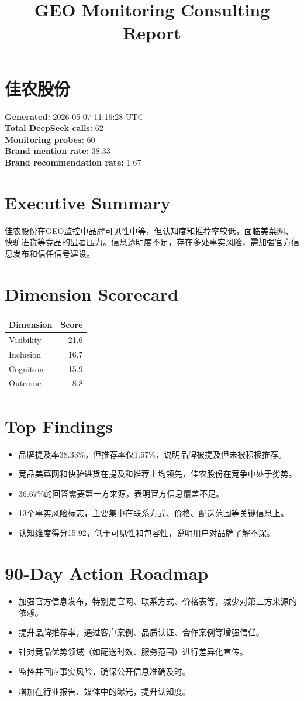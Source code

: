 \documentclass[11pt]{article}
\title{GEO Monitoring Consulting Report}
\begin{document}
\maketitle
\section*{佳农股份}
\textbf{Generated:} 2026-05-07 11:16:28 UTC\\
\textbf{Total DeepSeek calls:} 62\\
\textbf{Monitoring probes:} 60\\
\textbf{Brand mention rate:} 38.33\\
\textbf{Brand recommendation rate:} 1.67\\
\section*{Executive Summary}
佳农股份在GEO监控中品牌可见性中等，但认知度和推荐率较低，面临美菜网、快驴进货等竞品的显著压力。信息透明度不足，存在多处事实风险，需加强官方信息发布和信任信号建设。
\section*{Dimension Scorecard}
\begin{tabular}{lr}\toprule Dimension & Score\\\midrule
Visibility & 21.6\\
Inclusion & 16.7\\
Cognition & 15.9\\
Outcome & 8.8\\
\bottomrule\end{tabular}
\section*{Top Findings}
\begin{itemize}
\item 品牌提及率38.33\%，但推荐率仅1.67\%，说明品牌被提及但未被积极推荐。
\item 竞品美菜网和快驴进货在提及和推荐上均领先，佳农股份在竞争中处于劣势。
\item 36.67\%的回答需要第一方来源，表明官方信息覆盖不足。
\item 13个事实风险标志，主要集中在联系方式、价格、配送范围等关键信息上。
\item 认知维度得分15.92，低于可见性和包容性，说明用户对品牌了解不深。
\end{itemize}
\section*{90-Day Action Roadmap}
\begin{itemize}
\item 加强官方信息发布，特别是官网、联系方式、价格表等，减少对第三方来源的依赖。
\item 提升品牌推荐率，通过客户案例、品质认证、合作案例等增强信任。
\item 针对竞品优势领域（如配送时效、服务范围）进行差异化宣传。
\item 监控并回应事实风险，确保公开信息准确及时。
\item 增加在行业报告、媒体中的曝光，提升认知度。
\end{itemize}
\end{document}
